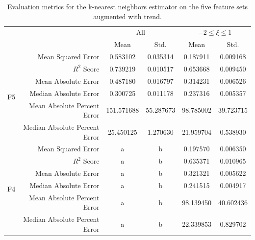 \documentclass[12pt]{book}
\begin{document}
\begin{table}[]
\centering
\caption{Evaluation metrics for the k-nearest neighbors estimator on the five feature sets augmented with trend.}
\label{tbl:knn_results_f5t}
\begin{tabular}{c|r|c|c|c|c}
& & \multicolumn{2}{c|}{All} & \multicolumn{2}{c}{$-2\le\xi\le1$} \\
& & Mean & Std. & Mean & Std.   \\ \hline
\multirow{6}{*}{F5} & Mean Squared Error 					& 0.583102   	& 0.035314  & 0.187911    & 0.009168    \\ 
& $R^2$ Score									& 0.739219   	& 0.010517 & 0.653668    & 0.009450      \\
& Mean Absolute Error 					& 0.487180   	& 0.016797  & 0.314231    & 0.006526     \\
& Median Absolute Error 				& 0.300725   	& 0.011178  & 0.237316    & 0.005357       \\
& Mean Absolute Percent Error  	& 151.571688	&  55.287673 & 98.785002   & 39.723715    \\
& Median Absolute Percent Error	& 25.450125   	& 1.270630  & 21.959704    & 0.538930 \\ \hline
\multirow{6}{*}{F4} & Mean Squared Error 					& a & b & 0.197570   & 0.006350   \\ 
& $R^2$ Score									& a & b & 0.635371   & 0.010965   \\
& Mean Absolute Error 					& a & b & 0.321321   & 0.005622   \\
& Median Absolute Error 				& a & b & 0.241515   & 0.004917   \\
& Mean Absolute Percent Error  	& a & b & 98.139450  & 40.602436  \\
& Median Absolute Percent Error	& a & b & 22.339853    & 0.829702  \\ \hline
\end{tabular}
\end{table}
\end{document}
